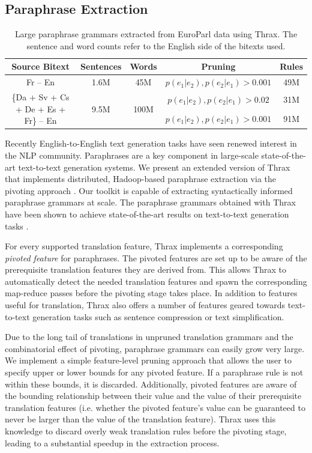\documentclass[11pt]{article}
\begin{document}
\subsection{Paraphrase Extraction}

\begin{table}[!t]
\centering
\begin{tabular}{|c|c|c|c|c|}
  \hline
  Source Bitext & Sentences & Words & Pruning & Rules \\
  \hline\hline
  Fr -- En & 1.6M & 45M & $p(e_1|e_2), p(e_2|e_1) > 0.001$ & 49M \\
  \hline
  \multirow{2}{*}{\{Da + Sv + Cs + De + Es + Fr\} -- En} &
  \multirow{2}{*}{9.5M} & \multirow{2}{*}{100M} & $p(e_1|e_2), p(e_2|e_1) > 0.02$ &
  31M \\
  & & & $p(e_1|e_2), p(e_2|e_1) > 0.001$ & 91M \\
  \hline
\end{tabular}
\caption{Large paraphrase grammars extracted from EuroParl data using
  Thrax. The sentence and word counts refer to the English side of the
  bitexts used.}
\label{tab-pivoting}
\end{table}

Recently English-to-English text generation tasks have seen renewed
interest in the NLP community. Paraphrases are a key component in
large-scale state-of-the-art text-to-text generation systems. We
present an extended version of Thrax that implements distributed,
Hadoop-based paraphrase extraction via the pivoting approach
\cite{Callison-Burch2005}. Our toolkit is capable of extracting
syntactically informed paraphrase grammars at scale. The paraphrase
grammars obtained with Thrax have been shown to achieve
state-of-the-art results on text-to-text generation tasks
\cite{Ganitkevitch2011}.

For every supported translation feature, Thrax implements a
corresponding \emph{pivoted feature} for paraphrases. The pivoted
features are set up to be aware of the prerequisite translation
features they are derived from. This allows Thrax to automatically
detect the needed translation features and spawn the corresponding
map-reduce passes before the pivoting stage takes place. In addition
to features useful for translation, Thrax also offers a number of
features geared towards text-to-text generation tasks such as
sentence compression or text simplification.

Due to the long tail of translations in unpruned translation grammars
and the combinatorial effect of pivoting, paraphrase grammars can
easily grow very large. We implement a simple feature-level pruning
approach that allows the user to specify upper or lower bounds for any
pivoted feature. If a paraphrase rule is not within these bounds, it
is discarded. Additionally, pivoted features are aware of the bounding
relationship between their value and the value of their prerequisite
translation features (i.e. whether the pivoted feature's value can be
guaranteed to never be larger than the value of the translation
feature). Thrax uses this knowledge to discard overly weak translation
rules before the pivoting stage, leading to a substantial speedup in
the extraction process.
\end{document}
